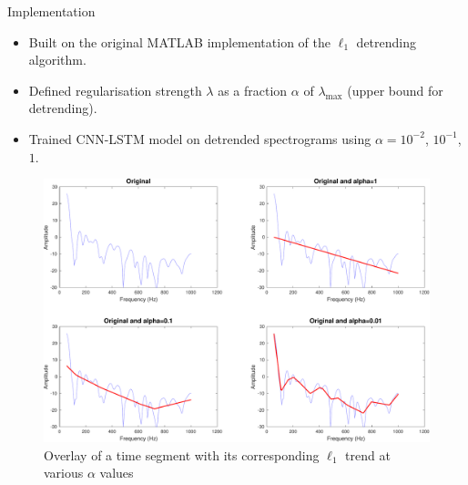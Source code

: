 \documentclass[]{beamer}
\begin{document}
\begin{frame}{Implementation}

    \begin{itemize}
        \item Built on the original MATLAB implementation of the $\ell_1$ detrending algorithm.
        \item Defined regularisation strength $\lambda$ as a fraction $\alpha$ of $\lambda_{\text{max}}$ (upper bound for detrending).
        \item Trained CNN-LSTM model on detrended spectrograms using $\alpha = 10^{-2}$, $10^{-1}$, $1$.
    \end{itemize}
\end{frame}

\begin{frame}[plain]{}
    \begin{figure}
        \captionsetup{font=scriptsize}
        \centering
        \includegraphics[width=\linewidth]{img/segment_l1_trend.pdf}
        \caption{Overlay of a time segment with its corresponding $\ell_1$ trend at various $\alpha$ values}
    \end{figure}
\end{frame}

\end{document}
